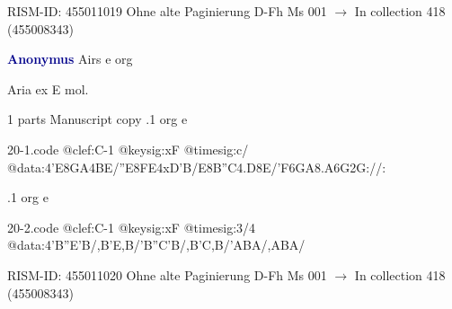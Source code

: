 \documentclass[twocolumn]{book}
\begin{document}
\newline RISM-ID: 455011019
\newline Ohne alte Paginierung
\newline D-Fh  Ms 001
\newline $\rightarrow$ In collection 418 (455008343)

\newline \par \vspace{7pt} \textcolor{darkblue}{\textbf{Anonymus  }}
\newline Airs  e  
\newline org
\newline \begin{itshape}[f.115v, heading:] Aria ex E mol.\end{itshape} 
\newline \textcolor{darkblue}{}  1 parts  
\newline Manuscript copy
.1  org  e  
\begin{filecontents*}{20-1.code}
@clef:C-1
@keysig:xF
@timesig:c/
@data:4'E{8GA}4BE/''E{8FE}4xD'B/E{8B''C}4.D8E/{'F6GA}{8.A6G}2G://:
\end{filecontents*}
\newline
%

.1  org  e  
\begin{filecontents*}{20-2.code}
@clef:C-1
@keysig:xF
@timesig:3/4
@data:4'B''E'B/,B'E,B/'B''C'B/,B'C,B/'ABA/,ABA/
\end{filecontents*}
\newline
%

\newline RISM-ID: 455011020
\newline Ohne alte Paginierung
\newline D-Fh  Ms 001
\newline $\rightarrow$ In collection 418 (455008343)
\end{document}
